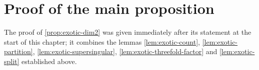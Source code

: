\section*{Proof of the main proposition}

The proof of \cref{prop:exotic-dim2} was given immediately after its statement at
the start of this chapter; it combines the lemmas
\cref{lem:exotic-count}, \cref{lem:exotic-partition},
\cref{lem:exotic-supersingular}, \cref{lem:exotic-threefold-factor} and
\cref{lem:exotic-split} established above.
